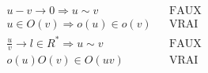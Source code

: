 \begin{align*}
 &u-v \rightarrow 0 \Rightarrow u \sim v & & \text{FAUX}\\
 &u \in O(v) \Rightarrow o(u) \in o(v) & & \text{VRAI}\\
 &\frac{u}{v}\rightarrow l\in R^* \Rightarrow u\sim v & & \text{FAUX}\\
 & o(u)  O(v) \in O(uv) & & \text{VRAI}
\end{align*}
